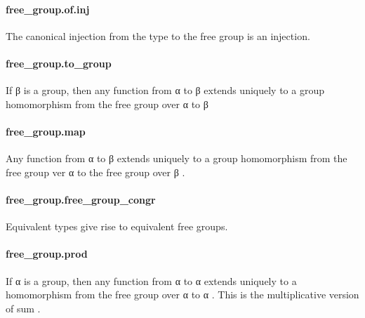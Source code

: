 \documentclass{article}
\begin{document}
\paragraph{free\_group.of.inj}
\par
The canonical injection from the type to the free group is an injection.
\paragraph{free\_group.to\_group}
\par
If 
\colorbox[RGB]{253,246,227}{{{{\color[RGB]{101, 123, 131} β }}}} is a group, then any function from 
\colorbox[RGB]{253,246,227}{{{{\color[RGB]{101, 123, 131} α }}}} to 
\colorbox[RGB]{253,246,227}{{{{\color[RGB]{101, 123, 131} β }}}}extends uniquely to a group homomorphism from
the free group over 
\colorbox[RGB]{253,246,227}{{{{\color[RGB]{101, 123, 131} α }}}} to 
\colorbox[RGB]{253,246,227}{{{{\color[RGB]{101, 123, 131} β }}}}\paragraph{free\_group.map}
\par
Any function from 
\colorbox[RGB]{253,246,227}{{{{\color[RGB]{101, 123, 131} α }}}} to 
\colorbox[RGB]{253,246,227}{{{{\color[RGB]{101, 123, 131} β }}}} extends uniquely
to a group homomorphism from the free group
ver 
\colorbox[RGB]{253,246,227}{{{{\color[RGB]{101, 123, 131} α }}}} to the free group over 
\colorbox[RGB]{253,246,227}{{{{\color[RGB]{101, 123, 131} β }}}}.
\paragraph{free\_group.free\_group\_congr}
\par
Equivalent types give rise to equivalent free groups.
\paragraph{free\_group.prod}
\par
If 
\colorbox[RGB]{253,246,227}{{{{\color[RGB]{101, 123, 131} α }}}} is a group, then any function from 
\colorbox[RGB]{253,246,227}{{{{\color[RGB]{101, 123, 131} α }}}} to 
\colorbox[RGB]{253,246,227}{{{{\color[RGB]{101, 123, 131} α }}}}extends uniquely to a homomorphism from the
free group over 
\colorbox[RGB]{253,246,227}{{{{\color[RGB]{101, 123, 131} α }}}} to 
\colorbox[RGB]{253,246,227}{{{{\color[RGB]{101, 123, 131} α }}}}. This is the multiplicative
version of 
\colorbox[RGB]{253,246,227}{{{{\color[RGB]{101, 123, 131} sum }}}}.
\end{document}

